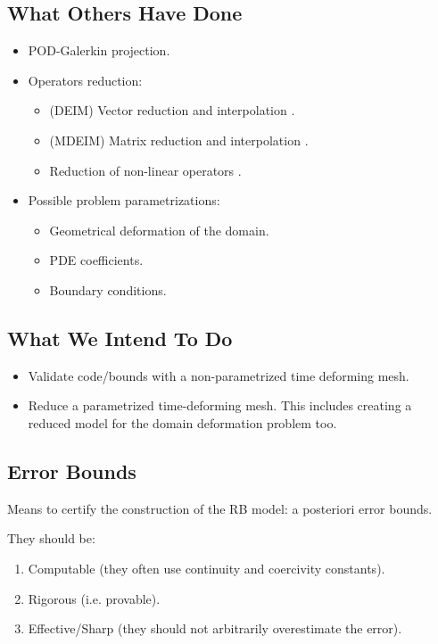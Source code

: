 \documentclass[thesis.tex]{subfiles}
\begin{document}
\subsection*{What Others Have Done}
\begin{itemize}
    \item POD-Galerkin projection.
    \item Operators reduction:
    \begin{itemize}
        \item (DEIM) Vector reduction and interpolation \cite{2010_nonlinearModelReductionDeim_chaturantabut}.
        \item (MDEIM) Matrix reduction and interpolation \cite{2015_efficientModelReductionParametrizedSystemsMatrixDeim_Negri}.
        \item Reduction of non-linear operators \cite{2018_podDeimReducedOrderModelDeformingMeshAeroelasticApplications_Donfrancesco}.
    \end{itemize}
    \item Possible problem parametrizations: 
    \begin{itemize}
        \item Geometrical deformation of the domain.
        \item PDE coefficients.
        \item Boundary conditions.
    \end{itemize}
\end{itemize}

\subsection*{What We Intend To Do}

\begin{itemize}
    \item Validate code/bounds with a non-parametrized time deforming mesh.
    \item Reduce a parametrized time-deforming mesh. This includes creating a reduced model for the domain deformation problem too.
\end{itemize}

\subsection*{Error Bounds}
Means to certify the construction of the RB model: a posteriori error bounds.

They should be:
\begin{enumerate}
    \item Computable (they often use continuity and coercivity constants).
    \item Rigorous (i.e. provable).
    \item Effective/Sharp (they should not arbitrarily overestimate the error).
\end{enumerate}
\end{document}
